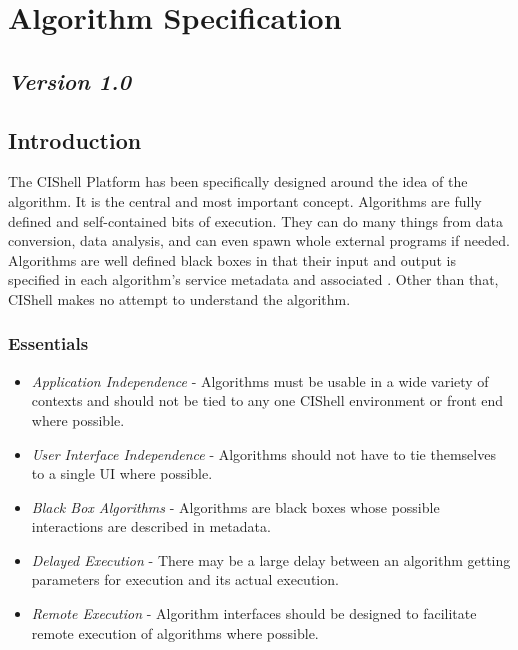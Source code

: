 %

\section{Algorithm Specification}

\subsection*{\textit{Version 1.0}}

\subsection{Introduction}

The CIShell Platform has been specifically designed around the idea of the
algorithm. It is the central and most important concept. Algorithms are fully
defined and self-contained bits of execution. They can do many things from data
conversion, data analysis, and can even spawn whole external programs if needed.
Algorithms are well defined black boxes in that their input and output is
specified in each algorithm's service metadata and associated
. Other than that, CIShell makes no attempt to understand
the algorithm.

\subsubsection{Essentials}
\begin{itemize}
  \item \textit{Application Independence} - Algorithms must be usable in a wide
  variety of contexts and should not be tied to any one CIShell environment or
  front end where possible.
  \item \textit{User Interface Independence} - Algorithms should not have to tie
  themselves to a single UI where possible.
  \item \textit{Black Box Algorithms} - Algorithms are black boxes whose
  possible interactions are described in metadata.
  \item \textit{Delayed Execution} - There may be a large delay between an
  algorithm getting parameters for execution and its actual execution.
  \item \textit{Remote Execution} - Algorithm interfaces should be designed to
  facilitate remote execution of algorithms where possible.
\end{itemize}

